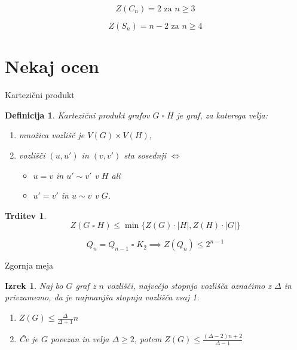 \documentclass{beamer}
\newtheorem{trditev}[theorem]{Trditev}
\newtheorem{izrek}[theorem]{Izrek}
\newtheorem{definicija}{Definicija}
\newcommand{\squarep}{\mathbin{\square}}
\begin{document}
\begin{frame}
    \[ Z(C_n) = 2 \text{ za } n \geq 3 \]
    
    \medskip
    
    \[ Z(S_n) = n-2 \text{ za } n \geq 4 \]
\end{frame}

\section{Nekaj ocen}
\begin{frame}{Kartezični produkt}
    \begin{definicija}
        \alert{Kartezični produkt} grafov $G \squarep H$ je graf, za katerega velja:
        \begin{enumerate}
            \item množica vozlišč je $V(G) \times V(H)$,
            \item vozlišči $(u,u')$ in $(v,v')$  sta sosednji $\iff$
            \begin{itemize}
                \item $u = v$ in $u' \sim v'$ v $H$ ali
                \item $u' = v'$ in $u \sim v$ v $G$.
            \end{itemize}
        \end{enumerate}
    \end{definicija}
    
    \begin{trditev}
        \[ Z(G \squarep H) \leq \min \{Z(G)\cdot|H|, Z(H) \cdot |G| \} \]
    \end{trditev}
    \vspace{-3mm}
    \[ Q_n = Q_{n-1} \squarep K_2 \implies Z(Q_{n}) \leq 2^{n-1} \]
\end{frame}

\begin{frame}{Zgornja meja}
    \begin{izrek}
        Naj bo $G$ graf z $n$ vozlišči, največjo stopnjo vozlišča označimo z $\Delta$ in privzamemo, da je najmanjša stopnja vozlišča vsaj 1.
        \begin{enumerate}
            \item $Z(G) \leq \frac{\Delta}{\Delta + 1} n$
            \item Če je $G$ povezan in velja $\Delta \geq 2$, potem $Z(G) \leq 
            \frac{(\Delta - 2)n + 2}{\Delta - 1}$
        \end{enumerate}
    \end{izrek}
\end{frame}

%    
\end{document}
